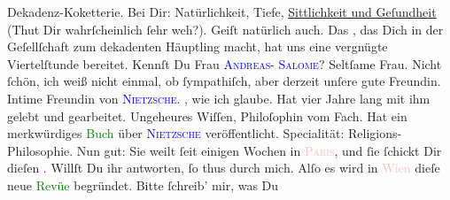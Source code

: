                Dekadenz-Koketterie. Bei Dir: Na{\pb}türlichkeit, Tiefe,
                  \uline{Sittlichkeit und Geſundheit} (Thut Dir
               wahrſcheinlich ſehr weh?).  Geiſt natürlich
               auch. Das \label{K_L02621-333v}\label{K_L02621-333h}, das Dich in der Geſellſchaft zum dekadenten Häuptling
               macht, hat uns eine vergnügte Viertelſtunde bereitet.\pend
           \pstart
           Kennſt Du Frau \textsc{\textcolor{blue}{Andreas- Salome}{}\ledrightnote{\textcolor{blue}{Lou Andreas-Salomé}}}? Seltſame Frau. Nicht ſchön, ich weiß nicht einmal, ob ſympathiſch, aber
               derzeit unſere gute Freundin. Intime Freundin von \textsc{\textcolor{blue}{Nietzsche}{}\ledrightnote{\textcolor{blue}{Friedrich Nietzsche}}}. \label{K_L02621-6v}\label{K_L02621-6h}, wie ich glaube. Hat vier Jahre lang mit ihm
               gelebt und gearbeitet. Ungeheures Wiſſen, Philo{\pb}ſophin vom Fach. Hat ein merkwürdiges \textcolor{green}{Buch}{}\ledrightnote{\textcolor{green}{Friedrich Nietzsche in seinen Werken}}
               über \textsc{\textcolor{blue}{Nietzsche}{}\ledrightnote{\textcolor{blue}{Friedrich Nietzsche}}} veröffentlicht. Specialität: Religions-Philosophie. Nun gut: Sie weilt ſeit
               einigen Wochen in \textsc{\textcolor{pink}{Paris}{}\ledrightnote{\textcolor{pink}{Paris}}}, und ſie ſchickt Dir dieſen \label{K_L02621-9v}\label{K_L02621-9h}. Willſt Du ihr antworten, ſo thus
               durch mich.\pend
           \pstart
           Alſo es \strikeout{\textcolor{gray}{wa}} wird in \textcolor{pink}{Wien}{}\ledrightnote{\textcolor{pink}{Wien}} dieſe neue \textcolor{green}{Revüe}{} begründet. Bitte ſchreib’ mir, was Du
